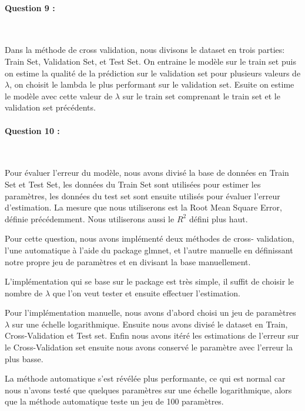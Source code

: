 \documentclass{article}
\begin{document}
	\paragraph{Question 9 :}
	~\par
	
	Dans la méthode de cross validation, nous divisons le dataset en trois parties: 
	Train Set, Validation Set, et Test Set.
	On entraine le modèle sur le train set puis on estime la qualité de la prédiction sur le validation set pour plusieurs valeurs de $\lambda$, on choisit le lambda le plus performant sur le validation set. Esuite on estime le modèle avec cette valeur de $\lambda$ sur le train set comprenant le train set et le validation set précédents.
	
	\paragraph{Question 10 :}
	~\par
	
	Pour évaluer l'erreur du modèle, nous avons divisé la base de données en Train Set et Test Set, les données du Train Set sont utilisées pour estimer les paramètres, les données du test set sont ensuite utilisés pour évaluer l'erreur d'estimation. La mesure que nous utiliserons est la Root Mean Square Error, définie précédemment. Nous utiliserons aussi le $R^{2}$ défini plus haut.
	
	Pour cette question, nous avons implémenté deux méthodes de cross- validation, l'une automatique à l'aide du package glmnet, et l'autre manuelle en définissant notre propre jeu de paramètres et en divisant la base manuellement.
	
	L'implémentation qui se base sur le package est très simple, il suffit de choisir le nombre de $\lambda$ que l'on veut tester et ensuite effectuer l'estimation.
	
	Pour l'implémentation manuelle, nous avons d'abord choisi un jeu de paramètres $\lambda$ sur une échelle logarithmique. Ensuite nous avons divisé le dataset en Train, Cross-Validation et Test set. Enfin nous avons itéré les estimations de l'erreur sur le Cross-Validation set ensuite nous avons conservé le paramètre avec l'erreur la plus basse.
	
	La méthode automatique s'est révélée plus performante, ce qui est normal car nous n'avons testé que quelques paramètres sur une échelle logarithmique, alors que la méthode automatique teste un jeu de 100 paramètres.	
\end{document}
